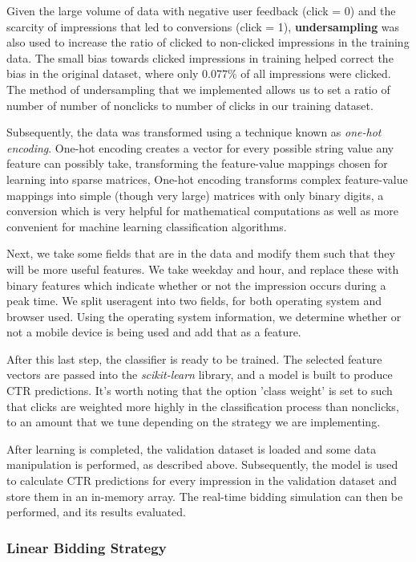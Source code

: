 \documentclass{sig-alternate-05-2015}
\begin{document}
Given the large volume of data with negative user feedback (click = 0) and the scarcity of impressions that led to conversions (click = 1), \textbf{undersampling} was also used to increase the ratio of clicked to non-clicked impressions in the training data. The small bias towards clicked impressions in training helped correct the bias in the original dataset, where only 0.077\% of all impressions were clicked. The method of undersampling that we implemented allows us to set a ratio of number of number of nonclicks to number of clicks in our training dataset.

Subsequently, the data was transformed using a technique known as \textit{one-hot encoding}. One-hot encoding creates a vector for every possible string value any feature can possibly take, transforming the feature-value mappings chosen for learning into sparse matrices, One-hot encoding transforms complex feature-value mappings into simple (though very large) matrices with only binary digits, a conversion which is very helpful for mathematical computations as well as more convenient for machine learning classification algorithms.

Next, we take some fields that are in the data and modify them such that they will be more useful features. We take weekday and hour, and replace these with binary features which indicate whether or not the impression occurs during a peak time. We split useragent into two fields, for both operating system and browser used. Using the operating system information, we determine whether or not a mobile device is being used and add that as a feature.

After this last step, the classifier is ready to be trained. The selected feature vectors are passed into the \textit{scikit-learn} library, and a model is built to produce CTR predictions. It's worth noting that the option 'class weight' is set to such that clicks are weighted more highly in the classification process than nonclicks, to an amount that we tune depending on the strategy we are implementing.

After learning is completed, the validation dataset is loaded and some data manipulation is performed, as described above. Subsequently, the model is used to calculate CTR predictions for every impression in the validation dataset and store them in an in-memory array. The real-time bidding simulation can then be performed, and its results evaluated.

\subsubsection{Linear Bidding Strategy}
\end{document}
